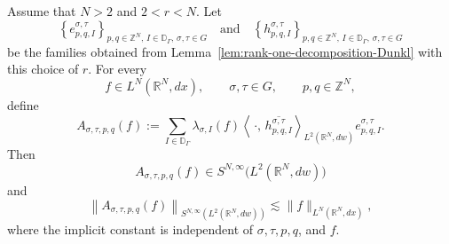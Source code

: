\documentclass[12pt]{amsart}
\begin{document}
\begin{lemma}\label{lem:Cwikel-rank-one-block}
Assume that $N>2$ and $2<r<N$.
Let
\[
\left\{
e_{p,q,I}^{\sigma,\tau}
\right\}_{p,q\in\mathbb Z^N,\,
I\in\mathbb D_\Gamma,\,
\sigma,\tau\in G}
\quad\text{and}\quad
\left\{
h_{p,q,I}^{\sigma,\tau}
\right\}_{p,q\in\mathbb Z^N,\,
I\in\mathbb D_\Gamma,\,
\sigma,\tau\in G}
\]
be the families obtained from
Lemma~\ref{lem:rank-one-decomposition-Dunkl} with this choice of $r$.
For every
\[
f\in L^N(\mathbb R^N,dx),
\qquad
\sigma,\tau\in G,
\qquad
p,q\in\mathbb Z^N,
\]
define
\[
A_{\sigma,\tau,p,q}(f)
:=
\sum_{I\in\mathbb D_\Gamma}
\lambda_{\sigma,I}(f)
\left\langle
\,\cdot,\,
\overline{h_{p,q,I}^{\sigma,\tau}}
\right\rangle_{L^2(\mathbb R^N,dw)}
e_{p,q,I}^{\sigma,\tau}.
\]
Then
\[
A_{\sigma,\tau,p,q}(f)
\in
S^{N,\infty}\bigl(L^2(\mathbb R^N,dw)\bigr)
\]
and
\begin{equation}\label{eq:Cwikel-rank-one-block}
\left\|
A_{\sigma,\tau,p,q}(f)
\right\|_
{S^{N,\infty}(L^2(\mathbb R^N,dw))}
\lesssim
\|f\|_{L^N(\mathbb R^N,dx)},
\end{equation}
where the implicit constant is independent of
$\sigma,\tau,p,q$, and $f$.
\end{lemma}
\end{document}
